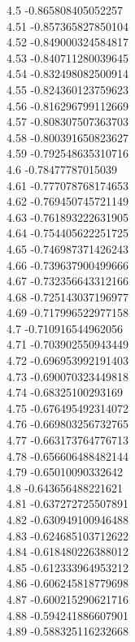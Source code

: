 {4.5	-0.865808405052257\\
4.51	-0.857365827850104\\
4.52	-0.849000324584817\\
4.53	-0.840711280039645\\
4.54	-0.832498082500914\\
4.55	-0.824360123759623\\
4.56	-0.816296799112669\\
4.57	-0.808307507363703\\
4.58	-0.800391650823627\\
4.59	-0.792548635310716\\
4.6	-0.78477787015039\\
4.61	-0.777078768174653\\
4.62	-0.769450745721149\\
4.63	-0.761893222631905\\
4.64	-0.754405622251725\\
4.65	-0.746987371426243\\
4.66	-0.739637900499666\\
4.67	-0.732356643312166\\
4.68	-0.725143037196977\\
4.69	-0.717996522977158\\
4.7	-0.710916544962056\\
4.71	-0.703902550943449\\
4.72	-0.696953992191403\\
4.73	-0.690070323449818\\
4.74	-0.68325100293169\\
4.75	-0.676495492314072\\
4.76	-0.669803256732765\\
4.77	-0.663173764776713\\
4.78	-0.656606488482144\\
4.79	-0.65010090332642\\
4.8	-0.643656488221621\\
4.81	-0.637272725507891\\
4.82	-0.630949100946488\\
4.83	-0.624685103712622\\
4.84	-0.618480226388012\\
4.85	-0.612333964953212\\
4.86	-0.606245818779698\\
4.87	-0.600215290621716\\
4.88	-0.594241886607901\\
4.89	-0.588325116232668\\
}
